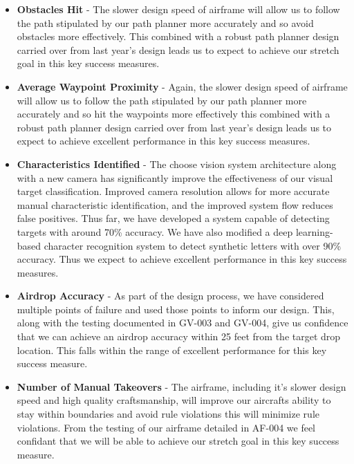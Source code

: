 \documentclass{auvsi_doc}
\begin{document}
\begin{itemize}
	\item\textbf{Obstacles Hit} - The slower design speed of airframe will allow us to follow the path stipulated by our path planner more accurately and so avoid obstacles more effectively. This combined with a robust path planner design carried over from last year's design leads us to expect to achieve our stretch goal in this key success measures.
	\item\textbf{Average Waypoint Proximity} - Again, the slower design speed of airframe will allow us to follow the path stipulated by our path planner more accurately and so hit the waypoints more effectively this combined with a robust path planner design carried over from last year's design leads us to expect to achieve excellent performance in this key success measures.
	\item\textbf{Characteristics Identified} - The choose vision system architecture along with a new camera has significantly improve the effectiveness of our visual target classification. Improved camera resolution allows for more accurate manual characteristic identification, and the improved system flow reduces false positives. Thus far, we have developed a system capable of detecting targets with around 70\% accuracy. We have also modified a deep learning-based character recognition system to detect synthetic letters with over 90\% accuracy. Thus we expect to achieve excellent performance in this key success measures.
	\item\textbf{Airdrop Accuracy} - As part of the design process, we have considered multiple points of failure and used those points to inform our design. This, along with the testing documented in GV-003 and GV-004, give us confidence that we can achieve an airdrop accuracy within 25 feet from the target drop location. This falls within the range of excellent performance for this key success measure.
	\item\textbf{Number of Manual Takeovers} - The airframe, including it's slower design speed and high quality craftsmanship, will improve our aircrafts ability to stay within boundaries and avoid rule violations this will minimize rule violations. From the testing of our airframe detailed in AF-004 we feel confidant that we will be able to achieve our stretch goal in this key success measure.
\end{itemize}
\end{document}
